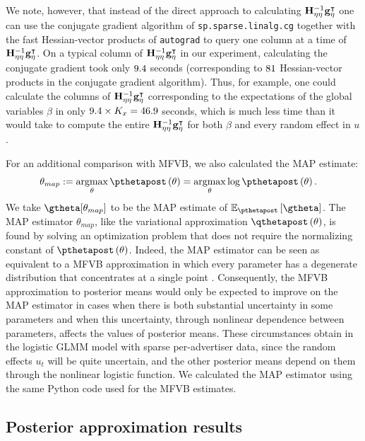 \documentclass{article}\usepackage[]{graphicx}\usepackage[]{color}
\theoremstyle{plain}
\theoremstyle{definition}
\theoremstyle{plain}
\theoremstyle{plain}
\theoremstyle{plain}
\theoremstyle{plain}
\begin{document}
We note, however, that instead of the direct approach to calculating
$\mathbf{H}_{\eta\eta}^{-1}\mathbf{g}_{\eta}^{\intercal}$ one can use the conjugate gradient
algorithm of \texttt{sp.sparse.linalg.cg} \citep[Chapter 5]{nocedalwright:1999:numerical}
together with the fast Hessian-vector products of \texttt{autograd}
to query one column at a time of $\mathbf{H}_{\eta\eta}^{-1}\mathbf{g}_{\eta}^{\intercal}$.
On a typical column of $\mathbf{H}_{\eta\eta}^{-1}\mathbf{g}_{\eta}^{\intercal}$ in our experiment,
calculating the conjugate gradient took only $9.4$ seconds
(corresponding to $81$ Hessian-vector products in the
conjugate gradient algorithm). Thus, for example, one could calculate
the columns of $\mathbf{H}_{\eta\eta}^{-1}\mathbf{g}_{\eta}^{\intercal}$ corresponding to the
expectations of the global variables $\beta$ in only $9.4\times K_{x}=46.9$
seconds, which is much less time than it would take to compute the
entire $\mathbf{H}_{\eta\eta}^{-1}\mathbf{g}_{\eta}^{\intercal}$ for both $\beta$ and every
random effect in $u$.

For an additional comparison with MFVB, we also calculated the MAP
estimate:
\begin{align*}
\theta_{map} & :=\argmax_{\theta}\pthetapost\left(\theta\right)=\argmax_{\theta}\log\pthetapost\left(\theta\right).
\end{align*}
We take $\gtheta[\theta_{map}]$ to be the MAP estimate of $\epgtheta$.
The MAP estimator $\theta_{map}$, like the variational approximation
$\qthetapost\left(\theta\right)$, is found by solving an optimization
problem that does not require the normalizing constant of $\pthetapost\left(\theta\right)$.
Indeed, the MAP estimator can be seen as equivalent to a MFVB approximation
in which every parameter has a degenerate distribution that concentrates
at a single point \citep{neal:1998:variationalEM}. Consequently,
the MFVB approximation to posterior means would only be expected to
improve on the MAP estimator in cases when there is both substantial
uncertainty in some parameters and when this uncertainty, through
nonlinear dependence between parameters, affects the values of posterior
means. These circumstances obtain in the logistic GLMM model with
sparse per-advertiser data, since the random effects $u_{t}$ will
be quite uncertain, and the other posterior means depend on them through
the nonlinear logistic function. We calculated the MAP estimator using
the same Python code used for the MFVB estimates.

\subsection{Posterior approximation results\label{subsec:glmm_Means-and-variances}}
\end{document}
